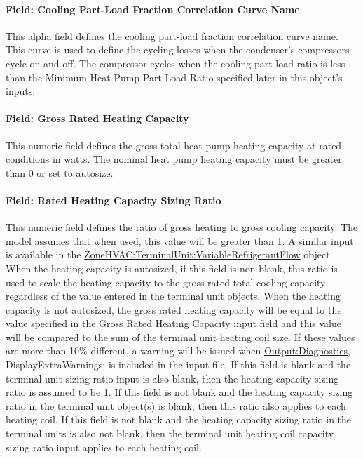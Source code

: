 \paragraph{Field: Cooling Part-Load Fraction Correlation Curve Name}\label{field-cooling-part-load-fraction-correlation-curve-name}

This alpha field defines the cooling part-load fraction correlation curve name. This curve is used to define the cycling losses when the condenser's compressors cycle on and off. The compressor cycles when the cooling part-load ratio is less than the Minimum Heat Pump Part-Load Ratio specified later in this object's inputs.

\paragraph{Field: Gross Rated Heating Capacity}\label{field-gross-rated-heating-capacity-001}

This numeric field defines the gross total heat pump heating capacity at rated conditions in watts. The nominal heat pump heating capacity must be greater than 0 or set to autosize.

\paragraph{Field: Rated Heating Capacity Sizing Ratio}\label{field-rated-heating-capacity-sizing-ratio-000}

This numeric field defines the ratio of gross heating to gross cooling capacity. The model assumes that when used, this value will be greater than 1. A similar input is available in the \hyperref[zonehvacterminalunitvariablerefrigerantflow]{ZoneHVAC:TerminalUnit:VariableRefrigerantFlow} object. When the heating capacity is autosized, if this field is non-blank, this ratio is used to scale the heating capacity to the gross rated total cooling capacity regardless of the value entered in the terminal unit objects. When the heating capacity is not autosized, the gross rated heating capacity will be equal to the value specified in the Gross Rated Heating Capacity input field and this value will be compared to the sum of the terminal unit heating coil size. If these values are more than 10\% different, a warning will be issued when \hyperref[outputdiagnostics]{Output:Diagnostics}, DisplayExtraWarnings; is included in the input file. If this field is blank and the terminal unit sizing ratio input is also blank, then the heating capacity sizing ratio is assumed to be 1. If this field is not blank and the heating capacity sizing ratio in the terminal unit object(s) is blank, then this ratio also applies to each heating coil. If this field is not blank and the heating capacity sizing ratio in the terminal units is also not blank, then the terminal unit heating coil capacity sizing ratio input applies to each heating coil.

